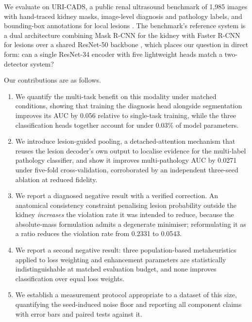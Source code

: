 \documentclass[pdflatex,sn-mathphys-num]{sn-jnl}
\theoremstyle{thmstyleone}%
\theoremstyle{thmstyletwo}%
\theoremstyle{thmstylethree}%
\begin{document}
We evaluate on URI-CADS, a public renal ultrasound benchmark of 1,985 images with hand-traced
kidney masks, image-level diagnosis and pathology labels, and bounding-box annotations for local
lesions \cite{bib_uricads}. The benchmark's reference system is a dual architecture combining
Mask R-CNN for the kidney with Faster R-CNN for lesions over a shared ResNet-50 backbone
\cite{bib_maskrcnn,bib_fasterrcnn,bib_resnet}, which places our question in direct form: can a
single ResNet-34 encoder with five lightweight heads match a two-detector system?

Our contributions are as follows.

\begin{enumerate}
\item We quantify the multi-task benefit on this modality under matched conditions, showing that
training the diagnosis head alongside segmentation improves its AUC by 0.056 relative to
single-task training, while the three classification heads together account for under 0.03\% of
model parameters.

\item We introduce lesion-guided pooling, a detached-attention mechanism that reuses the lesion
decoder's own output to localise evidence for the multi-label pathology classifier, and show it
improves multi-pathology AUC by 0.0271 under five-fold cross-validation, corroborated by an
independent three-seed ablation at reduced fidelity.

\item We report a diagnosed negative result with a verified correction. An anatomical
consistency constraint penalising lesion probability outside the kidney \emph{increases} the
violation rate it was intended to reduce, because the absolute-mass formulation admits a
degenerate minimiser; reformulating it as a ratio reduces the violation rate from 0.2331 to
0.0543.

\item We report a second negative result: three population-based metaheuristics applied to loss
weighting and enhancement parameters are statistically indistinguishable at matched evaluation
budget, and none improves classification over equal loss weights.

\item We establish a measurement protocol appropriate to a dataset of this size, quantifying the
seed-induced noise floor and reporting all component claims with error bars and paired tests
against it.
\end{enumerate}
\end{document}

